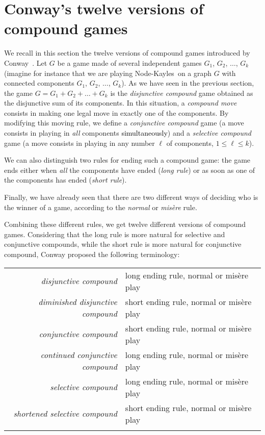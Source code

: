 \documentclass[11pt]{article}
\newcommand{\modif}[1]{\textcolor{black}{#1}}
\newcommand{\NK}{Node-Kayles}
\begin{document}
\section{Conway's twelve versions of compound games}
\label{sec:conway}

We recall in this section the twelve versions of compound games
introduced by Conway~\cite[Chapter~14]{ONAG}. 
Let $G$ be a game
made of several independent games $G_1$, $G_2$, $\dots$, $G_k$
(imagine for instance that we are playing \NK\ on a graph
$G$ with connected components $G_1$, $G_2$, $\dots$, $G_k$).
As we have seen in the previous section, 
the game $G=G_1+G_2+\dots +G_k$ is the {\em disjunctive compound} game obtained
as the disjunctive sum of its components. In this situation,
a {\em compound move} consists in making one legal move in
exactly one of the components.
By modifying this moving rule, we define a {\em conjunctive
compound} game (a move consists in playing in {\em all}
components \modif{simultaneously}) and a {\em selective compound}
game (a move consists in playing in any number $\ell$ of components,
$1\le\ell\le k$).

We can also distinguish two rules for ending such a compound game:
the game ends either when {\em all} the components have ended 
({\em long rule}) or as soon as one of the components has ended
({\em short rule}).

Finally, we have already seen that there are two different ways of deciding
who is the winner of a game, according to the {\em normal}
or {\em mis\`ere} rule.

Combining these different rules, we get twelve different versions of
compound games. Considering that the long rule is more natural for
selective and conjunctive compounds, while the short rule is more
natural for conjunctive compound, Conway proposed the following
terminology:

\begin{tabular}{rl}
  \\
  {\em disjunctive compound} & long ending rule, normal or mis\`ere play \\
  {\em diminished disjunctive compound} & short ending rule, normal or mis\`ere play \\
  {\em conjunctive compound} & short ending rule, normal or mis\`ere play \\
  {\em continued conjunctive compound} & long ending rule, normal or mis\`ere play \\
  {\em selective compound} & long ending rule, normal or mis\`ere play \\
  {\em shortened selective compound} & short ending rule, normal or mis\`ere play \\
  \\
\end{tabular}
\end{document}
